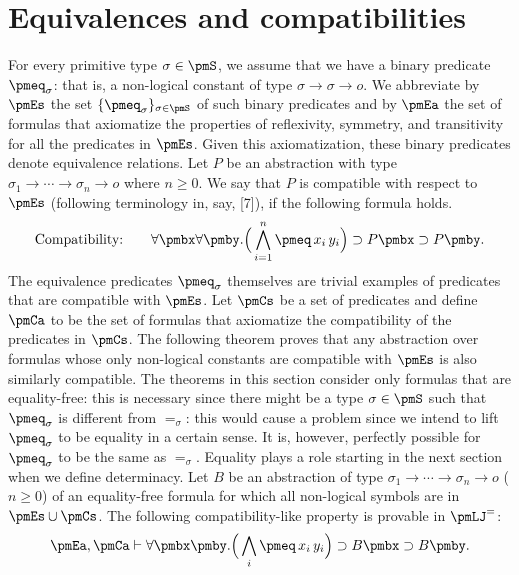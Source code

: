 \section*{Equivalences and compatibilities}
For every primitive type $\sigma\in\pmS$, we assume that we have a binary predicate $\pmeq_\sigma$: that is, a non-logical constant of type $\sigma\to\sigma\to o$. We abbreviate by $\pmEs$ the set $\{\pmeq_\sigma\}_{\sigma\in\pmS}$ of such binary predicates and by $\pmEa$ the set of formulas that axiomatize the properties of reflexivity, symmetry, and transitivity for all the predicates in $\pmEs$. Given this axiomatization, these binary predicates denote equivalence relations.
Let $P$ be an abstraction with type $\sigma_1\to\cdots\to\sigma_n\to o$ where $n\geq0$. We say that $P$ is compatible with respect to $\pmEs$ (following terminology in, say, [7]), if the following formula holds.
\[\text{Compatibility:}\qquad\forall\pmbx\forall\pmby.\Big(\bigwedge_{i=1}^n\pmeq\,x_i\,y_i\Big)\supset P\pmbx\supset P\pmby.\]
The equivalence predicates $\pmeq_\sigma$ themselves are trivial examples of predicates that are compatible with $\pmEs$.
Let $\pmCs$ be a set of predicates and define $\pmCa$ to be the set of formulas that axiomatize the compatibility of the predicates in $\pmCs$. The following theorem proves that any abstraction over formulas whose only non-logical constants are compatible with $\pmEs$ is also similarly compatible.
The theorems in this section consider only formulas that are equality-free: this is necessary since there might be a type $\sigma\in\pmS$ such that $\pmeq_\sigma$ is different from $=_\sigma$: this would cause a problem since we intend to lift $\pmeq_\sigma$ to be equality in a certain sense. It is, however, perfectly possible for $\pmeq_\sigma$ to be the same as $=_\sigma$. Equality plays a role starting in the next section when we define determinacy.
 Let $B$ be an abstraction of type $\sigma_1\to\cdots\to\sigma_n\to o$ ($n\geq0$) of an equality-free formula for which all non-logical symbols are in $\pmEs\cup\pmCs$. The following compatibility-like property is provable in $\pmLJ^=$:
\[\pmEa,\pmCa\vdash\forall\pmbx\pmby.\Big(\bigwedge_i\pmeq\,x_i\,y_i\Big)\supset B\pmbx\supset B\pmby.\]

